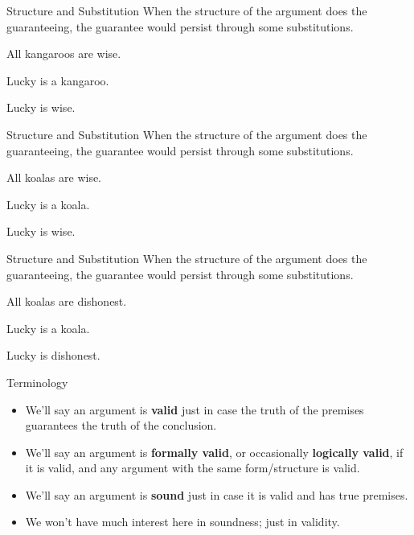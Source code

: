 \documentclass[
  ignorenonframetext,
]{beamer}
\providecommand{\tightlist}{%
  \setlength{\itemsep}{0pt}\setlength{\parskip}{0pt}}
\renewcommand{\,}{\text{, }}
\begin{document}
\begin{frame}{Structure and Substitution}
\protect\hypertarget{structure-and-substitution-1}{}
When the structure of the argument does the guaranteeing, the guarantee
would persist through some substitutions.

\begin{description}
\tightlist
\item[~]
All kangaroos are wise.
\item[~]
Lucky is a kangaroo.
\item[\(\therefore\)]
Lucky is wise.
\end{description}
\end{frame}

\begin{frame}{Structure and Substitution}
\protect\hypertarget{structure-and-substitution-2}{}
When the structure of the argument does the guaranteeing, the guarantee
would persist through some substitutions.

\begin{description}
\tightlist
\item[~]
All koalas are wise.
\item[~]
Lucky is a koala.
\item[\(\therefore\)]
Lucky is wise.
\end{description}
\end{frame}

\begin{frame}{Structure and Substitution}
\protect\hypertarget{structure-and-substitution-3}{}
When the structure of the argument does the guaranteeing, the guarantee
would persist through some substitutions.

\begin{description}
\tightlist
\item[~]
All koalas are dishonest.
\item[~]
Lucky is a koala.
\item[\(\therefore\)]
Lucky is dishonest.
\end{description}
\end{frame}

\begin{frame}{Terminology}
\protect\hypertarget{terminology-1}{}
\begin{itemize}
\tightlist
\item
  We'll say an argument is \textbf{valid} just in case the truth of the
  premises guarantees the truth of the conclusion.
\item
  We'll say an argument is \textbf{formally valid}, or occasionally
  \textbf{logically valid}, if it is valid, and any argument with the
  same form/structure is valid.
\item
  We'll say an argument is \textbf{sound} just in case it is valid and
  has true premises.
\item
  We won't have much interest here in soundness; just in validity.
\end{itemize}
\end{frame}
\end{document}
